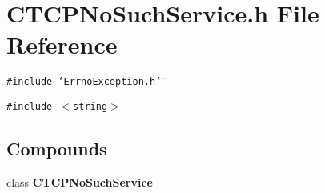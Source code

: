 \section{CTCPNo\-Such\-Service.h File Reference}
\label{CTCPNoSuchService_8h}
{\tt \#include \char`\"{}Errno\-Exception.h\char`\"{}}\par
{\tt \#include $<$string$>$}\par
\subsection*{Compounds}
\begin{CompactItemize}
\item 
class {\bf CTCPNo\-Such\-Service}
\end{CompactItemize}
